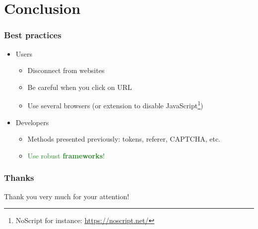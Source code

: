 \documentclass[svgnames]{beamer}
\begin{document}
\section*{Conclusion}
\begin{frame}
  \frametitle{Best practices}
  \begin{itemize}
   \item Users
   \pause
   \begin{itemize}
    \item Disconnect from websites
    \item Be careful when you click on URL %
    \item Use several browsers (or extension to disable JavaScript\footnote{NoScript for instance: \url{https://noscript.net/}})
   \end{itemize}
   \pause
   \item Developers
   \begin{itemize}
    \item Methods presented previously: tokens, referer, CAPTCHA, etc.
    \pause
    \item \textcolor{ForestGreen}{Use robust \textbf{frameworks}!} %
   \end{itemize}

  \end{itemize}
\end{frame}


\begin{frame}
  \frametitle{Thanks}
  \begin{center}
    Thank you very much for your attention!
  \end{center}
\end{frame}
\end{document}
